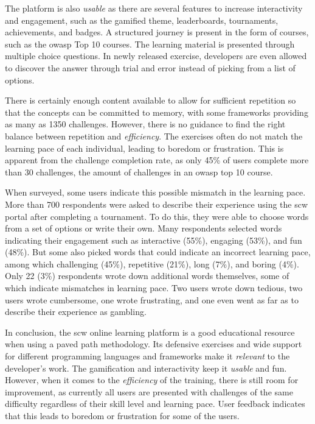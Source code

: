 The platform is also \textit{usable} as there are several features to increase interactivity and engagement, such as the gamified theme, leaderboards, tournaments, achievements, and badges.
A structured journey is present in the form of courses, such as the \gls{owasp} Top 10 courses.
The learning material is presented through multiple choice questions.
In newly released exercise, developers are even allowed to discover the answer through trial and error instead of picking from a list of options.

There is certainly enough content available to allow for sufficient repetition so that the concepts can be committed to memory, with some frameworks providing as many as 1350 challenges.
However, there is no guidance to find the right balance between repetition and \textit{efficiency}.
The exercises often do not match the learning pace of each individual, leading to boredom or frustration.
This is apparent from the challenge completion rate, as only 45\% of users complete more than 30 challenges, the amount of challenges in an \gls{owasp} top 10 course.

When surveyed, some users indicate this possible mismatch in the learning pace.
More than 700 respondents were asked to describe their experience using the \gls{scw} portal after completing a tournament.
To do this, they were able to choose words from a set of options or write their own.
Many respondents selected words indicating their engagement such as interactive (55\%), engaging (53\%), and fun (48\%).
But some also picked words that could indicate an incorrect learning pace, among which challenging (45\%), repetitive (21\%), long (7\%), and boring (4\%).
Only 22 (3\%) respondents wrote down additional words themselves, some of which indicate mismatches in learning pace. 
Two users wrote down tedious, two users wrote cumbersome, one wrote frustrating, and one even went as far as to describe their experience as gambling.

In conclusion, the \gls{scw} online learning platform is a good educational resource when using a paved path methodology. Its defensive exercises and wide support for different programming languages and frameworks make it \textit{relevant} to the developer's work. The gamification and interactivity keep it \textit{usable} and fun. However, when it comes to the \textit{efficiency} of the training, there is still room for improvement, as currently all users are presented with challenges of the same difficulty regardless of their skill level and learning pace.
User feedback indicates that this leads to boredom or frustration for some of the users. 